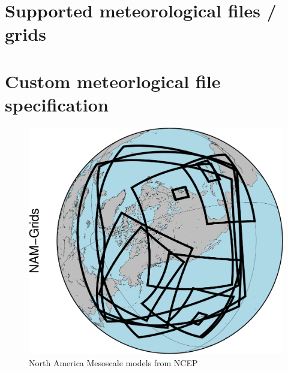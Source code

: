 \documentclass[11pt]{article}   %
\begin{document}



\clearpage
\section{Supported meteorological files / grids}

\clearpage
\section{Custom meteorlogical file specification}\label{SecCust}
\begin{figure}[htbp]\begin{center}
 \includegraphics[angle=-90,scale=1.0]{Figs/Geostationary_NAM-Grids.pdf}
\parbox{15cm}{\caption{\label{FigNAMs}
North America Mesoscale models from NCEP
}}
\end{center}\end{figure}
\end{document}
